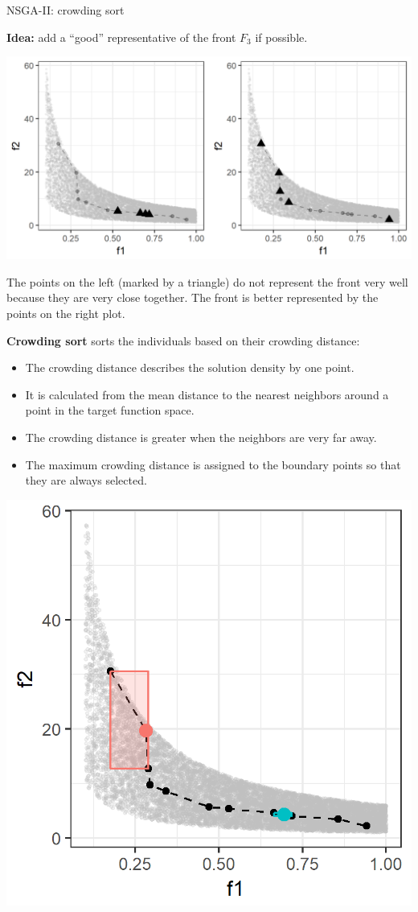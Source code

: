 \begin{frame}[allowframebreaks]{NSGA-II: crowding sort}

\textbf{Idea:} add a \enquote{good} representative of the front $F_3$ if possible.

\begin{center}
\includegraphics[height = 0.5\textheight]{images/NSGA2_CS1.png}
\end{center}

\begin{footnotesize}
The points on the left (marked by a triangle) do not represent the front very well because they are very close together. The front is better represented by the points on the right plot.
\end{footnotesize}

\framebreak

\textbf{Crowding sort} sorts the individuals based on their crowding distance:

\begin{itemize}
\item The crowding distance describes the solution density by one point.
\item It is calculated from the mean distance to the nearest neighbors around a point in the target function space.
\item The crowding distance is greater when the neighbors are very far away.
\item The maximum crowding distance is assigned to the boundary points so that they are always selected.
\end{itemize}

\begin{center}
\includegraphics[width = 0.4\linewidth]{images/NSGA2_CS2.png}
\end{center}


\end{frame}
